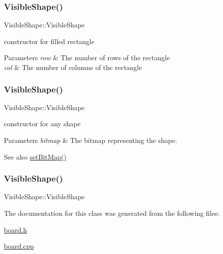 \subsubsection{\texorpdfstring{Visible\+Shape()}{VisibleShape()}\hspace{0.1cm}{\footnotesize\ttfamily [1/3]}}
{\footnotesize\ttfamily Visible\+Shape\+::\+Visible\+Shape}



constructor for filled rectangle 


\begin{DoxyParams}{Parameters}
{\em row} & The number of rows of the rectangle \\
\hline
{\em col} & The number of columns of the rectangle \\
\hline
\end{DoxyParams}
\mbox{\label{class_board_a0efa89e218acbaeaf4f2453467d54cc9}} 
\subsubsection{\texorpdfstring{Visible\+Shape()}{VisibleShape()}\hspace{0.1cm}{\footnotesize\ttfamily [2/3]}}
{\footnotesize\ttfamily Visible\+Shape\+::\+Visible\+Shape}



constructor for any shape 


\begin{DoxyParams}{Parameters}
{\em bitmap} & The bitmap representing the shape. \\
\hline
\end{DoxyParams}
\begin{DoxySeeAlso}{See also}
\mbox{\hyperlink{class_shape_ae79ee483d0f48a426d1a544fd22fd8e5}{set\+Bit\+Map()}} 
\end{DoxySeeAlso}
\mbox{\label{class_board_a280deeca2a39d227887ff2e13b009c0a}} 
\subsubsection{\texorpdfstring{Visible\+Shape()}{VisibleShape()}\hspace{0.1cm}{\footnotesize\ttfamily [3/3]}}
{\footnotesize\ttfamily Visible\+Shape\+::\+Visible\+Shape}



The documentation for this class was generated from the following files\+:\begin{DoxyCompactItemize}
\item 
\mbox{\hyperlink{board_8h}{board.\+h}}\item 
\mbox{\hyperlink{board_8cpp}{board.\+cpp}}\end{DoxyCompactItemize}
